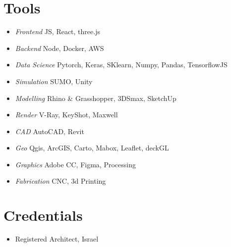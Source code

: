 \section*{Tools}
    
\begin{itemize}
    \item \textit{Frontend} \tab JS, React, three.js
    \item \textit{Backend} \tab Node, Docker, AWS 
    \item \textit{Data Science} \tab Pytorch, Keras, SKlearn, Numpy, Pandas, TensorflowJS 
    \item \textit{Simulation} \tab SUMO, Unity
    \item \textit{Modelling} \tab Rhino \& Grasshopper, 3DSmax, SketchUp 
    \item \textit{Render} \tab V-Ray, KeyShot, Maxwell
    \item \textit{CAD} \tab AutoCAD, Revit
    \item \textit{Geo} \tab Qgis, ArcGIS, Carto, Mabox, Leaflet, deckGL 
    \item \textit{Graphics} \tab Adobe CC, Figma, Processing
    \item \textit{Fabrication} \tab CNC, 3d Printing 
\end{itemize}

\section*{Credentials}

    \begin{itemize}
        \item Registered Architect, Israel 
    \end{itemize}



  















